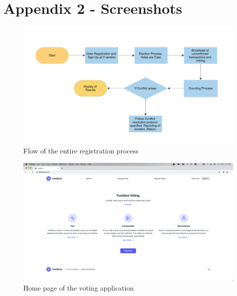 \documentclass{article}
\begin{document}
    
    \section*{Appendix 2 - Screenshots}

    \begin{figure}[h]
        \centering
        \includegraphics[width=1\textwidth]{complete_voting_procedure.png}
        \caption{Flow of the entire registration process}
    \end{figure}
    \begin{figure}[h]
        \centering
        \includegraphics[width=1\textwidth]{home_page.png}
        \caption{Home page of the voting application}
    \end{figure}
\end{document}
